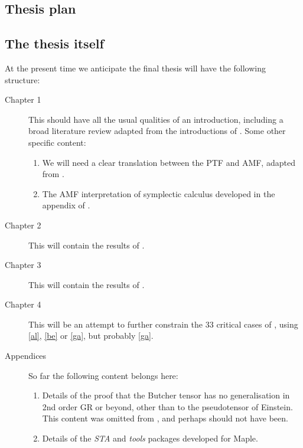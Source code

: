 \documentclass[twoside]{report}
\begin{document}
\begin{multicols}{2}
\section{Thesis plan}\label{plan}
\subsection{The thesis itself}
At the present time we anticipate the final thesis will have the following structure:
\begin{description}
  \item[Chapter 1] This should have all the usual qualities of an introduction, including a broad literature review adapted from the introductions of \cite{2019JMP....60e2504B,paper-2}. Some other specific content: 
    \begin{enumerate}
      \item We will need a clear translation between the PTF and AMF, adapted from \cite{dictionary}.
      \item The AMF interpretation of symplectic calculus developed in the appendix of \cite{2019JMP....60e2504B}.
    \end{enumerate}
  \item[Chapter 2] This will contain the results of \cite{2019JMP....60e2504B}.
  \item[Chapter 3] This will contain the results of \cite{paper-2}.
  \item[Chapter 4\label{c4}] This will be an attempt to further constrain the 33 critical cases of \cite{2019PhRvD..99f4001L,Lin2}, using \ref{al}, \ref{be} or \ref{ga}, but probably \ref{ga}.
  \item[Appendices] So far the following content belongs here:
    \begin{enumerate}
      \item Details of the proof that the Butcher tensor \cite{2014JPhCS.484a2011B,2012PhRvD..86h4012B,2012PhRvD..86h4013B} has no generalisation in 2nd order GR or beyond, other than to the pseudotensor of Einstein. This content was omitted from \cite{2019JMP....60e2504B}, and perhaps should not have been.
      \item Details of the \textit{STA} and \textit{tools} packages developed for Maple.
    \end{enumerate}
\end{description}

\end{multicols}
\end{document}
